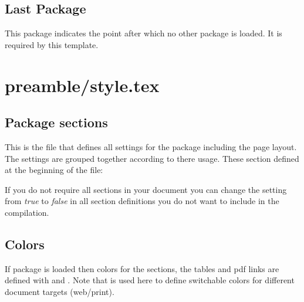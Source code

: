 \subsection{Last Package}
\label{sec:packages:last}

This package indicates the point after which no other package is loaded.
It is required by this template.



\section{preamble/style.tex}

\subsection{Package sections}
\label{sec:style:sections}

This is the file that defines all settings for the package including the page layout. The settings are grouped together according to there usage. 
These section defined at the beginning of the file:


If you do not require all sections in your document you can change the setting from \emph{true} to \emph{false} in all section definitions you do not want to include in the compilation.

\subsection{Colors}
\label{sec:style:colors}

If package  is loaded then colors for the sections, the tables and pdf links are defined with  and . Note that  is used here to define switchable colors for different document targets (web/print).


